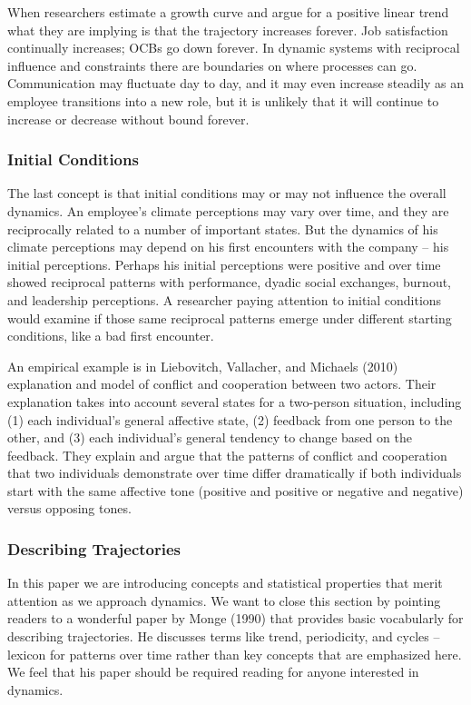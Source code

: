 \documentclass[english,,man]{apa6}
\theoremstyle{definition}
\theoremstyle{definition}
\theoremstyle{definition}
\theoremstyle{remark}
\begin{document}
When researchers estimate a growth curve and argue for a positive linear
trend what they are implying is that the trajectory increases forever.
Job satisfaction continually increases; OCBs go down forever. In dynamic
systems with reciprocal influence and constraints there are boundaries
on where processes can go. Communication may fluctuate day to day, and
it may even increase steadily as an employee transitions into a new
role, but it is unlikely that it will continue to increase or decrease
without bound forever.

\hypertarget{initial-conditions}{%
\subsubsection{Initial Conditions}\label{initial-conditions}}

The last concept is that initial conditions may or may not influence the
overall dynamics. An employee's climate perceptions may vary over time,
and they are reciprocally related to a number of important states. But
the dynamics of his climate perceptions may depend on his first
encounters with the company -- his initial perceptions. Perhaps his
initial perceptions were positive and over time showed reciprocal
patterns with performance, dyadic social exchanges, burnout, and
leadership perceptions. A researcher paying attention to initial
conditions would examine if those same reciprocal patterns emerge under
different starting conditions, like a bad first encounter.

An empirical example is in Liebovitch, Vallacher, and Michaels (2010)
explanation and model of conflict and cooperation between two actors.
Their explanation takes into account several states for a two-person
situation, including (1) each individual's general affective state, (2)
feedback from one person to the other, and (3) each individual's general
tendency to change based on the feedback. They explain and argue that
the patterns of conflict and cooperation that two individuals
demonstrate over time differ dramatically if both individuals start with
the same affective tone (positive and positive or negative and negative)
versus opposing tones.

\hypertarget{describing-trajectories}{%
\subsubsection{Describing Trajectories}\label{describing-trajectories}}

In this paper we are introducing concepts and statistical properties
that merit attention as we approach dynamics. We want to close this
section by pointing readers to a wonderful paper by Monge (1990) that
provides basic vocabularly for describing trajectories. He discusses
terms like trend, periodicity, and cycles -- lexicon for patterns over
time rather than key concepts that are emphasized here. We feel that his
paper should be required reading for anyone interested in dynamics.
\end{document}
